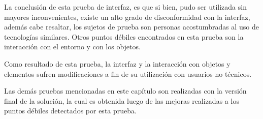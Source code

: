 La conclusión de esta prueba de interfaz, es que si bien, pudo ser utilizada sin
mayores inconvenientes, existe un alto grado de disconformidad con la interfaz,
además cabe resaltar, los sujetos de prueba son personas acostumbradas al uso de
tecnologías similares. Otros puntos débiles encontrados en esta prueba son la
interacción con el entorno y  con los objetos.

Como resultado de esta prueba, la interfaz y la interacción con objetos y
elementos sufren modificaciones a fin de su utilización con usuarios no
técnicos.

Las demás pruebas mencionadas en este capítulo son realizadas con la versión
final de la solución, la cual es obtenida luego de las mejoras realizadas a los
puntos débiles detectados por esta prueba.
